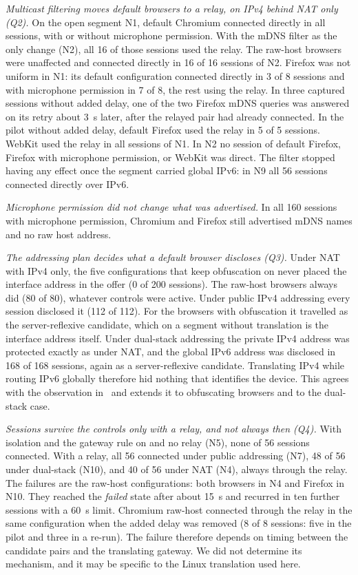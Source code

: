 \documentclass[conference]{IEEEtran}
\begin{document}
\textit{Multicast filtering moves default browsers to a relay, on IPv4 behind NAT only (Q2).} On the open segment N1, default Chromium connected directly in all sessions, with or without microphone permission. With the mDNS filter as the only change (N2), all 16 of those sessions used the relay. The raw-host browsers were unaffected and connected directly in 16 of 16 sessions of N2. Firefox was not uniform in N1: its default configuration connected directly in 3 of 8 sessions and with microphone permission in 7 of 8, the rest using the relay. In three captured sessions without added delay, one of the two Firefox mDNS queries was answered on its retry about 3~s later, after the relayed pair had already connected. In the pilot without added delay, default Firefox used the relay in 5 of 5 sessions. WebKit used the relay in all sessions of N1. In N2 no session of default Firefox, Firefox with microphone permission, or WebKit was direct. The filter stopped having any effect once the segment carried global IPv6: in N9 all 56 sessions connected directly over IPv6.

\textit{Microphone permission did not change what was advertised.} In all 160 sessions with microphone permission, Chromium and Firefox still advertised mDNS names and no raw host address.

\textit{The addressing plan decides what a default browser discloses (Q3).} Under NAT with IPv4 only, the five configurations that keep obfuscation on never placed the interface address in the offer (0 of 200 sessions). The raw-host browsers always did (80 of 80), whatever controls were active. Under public IPv4 addressing every session disclosed it (112 of 112). For the browsers with obfuscation it travelled as the server-reflexive candidate, which on a segment without translation is the interface address itself. Under dual-stack addressing the private IPv4 address was protected exactly as under NAT, and the global IPv6 address was disclosed in 168 of 168 sessions, again as a server-reflexive candidate. Translating IPv4 while routing IPv6 globally therefore hid nothing that identifies the device. This agrees with the observation in~\cite{nibert2025} and extends it to obfuscating browsers and to the dual-stack case.

\textit{Sessions survive the controls only with a relay, and not always then (Q4).} With isolation and the gateway rule on and no relay (N5), none of 56 sessions connected. With a relay, all 56 connected under public addressing (N7), 48 of 56 under dual-stack (N10), and 40 of 56 under NAT (N4), always through the relay. The failures are the raw-host configurations: both browsers in N4 and Firefox in N10. They reached the \textit{failed} state after about 15~s and recurred in ten further sessions with a 60~s limit. Chromium raw-host connected through the relay in the same configuration when the added delay was removed (8 of 8 sessions: five in the pilot and three in a re-run). The failure therefore depends on timing between the candidate pairs and the translating gateway. We did not determine its mechanism, and it may be specific to the Linux translation used here.
\end{document}
